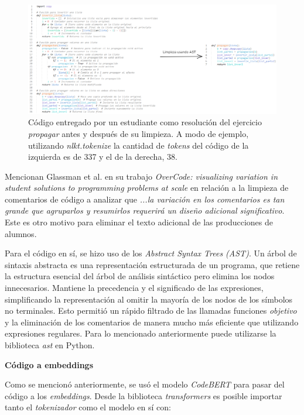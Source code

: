 \documentclass[11pt,a4paper,twoside,openany]{tesis}
\begin{document}
\begin{figure}[H]
    \centering
    \includegraphics[width=1\textwidth]{imagenes/ast.PNG}
    \caption{Código entregado por un estudiante como resolución del ejercicio \emph{propagar} antes y después de su limpieza. A modo de ejemplo, utilizando \emph{nlkt.tokenize} la cantidad de \emph{tokens} del código de la izquierda es de 337 y el de la derecha, 38.}
\end{figure}

Mencionan Glassman et al. en su trabajo \emph{OverCode: visualizing variation in student solutions to programming problems at scale} \cite{overcode} en relación a la limpieza de comentarios de código a analizar que \emph{...la variación en los comentarios es tan grande que agruparlos y resumirlos requerirá un diseño adicional significativo}. Este es otro motivo para eliminar el texto adicional de las producciones de alumnos.

Para el código en sí, se hizo uso de los \emph{Abstract Syntax Trees (AST)}. Un árbol de sintaxis abstracta es una representación estructurada de un programa, que retiene la estructura esencial del árbol de análisis sintáctico pero elimina los nodos innecesarios. Mantiene la precedencia y el significado de las expresiones, simplificando la representación al omitir la mayoría de los nodos de los símbolos no terminales\cite{cooper2011engineering}. Esto permitió un rápido filtrado de las llamadas funciones \emph{objetivo} y la eliminación de los comentarios de manera mucho más eficiente que utilizando expresiones regulares. Para lo mencionado anteriormente puede utilizarse la biblioteca \emph{ast} \cite{ast} en Python.



\textbf{Código a embeddings}

Como se mencionó anteriormente, se usó el modelo \emph{CodeBERT} para pasar del código a los \emph{embeddings}. Desde la biblioteca \emph{transformers} \cite{roberta_model} es posible importar tanto el \emph{tokenizador} como el modelo en sí con:
\end{document}
